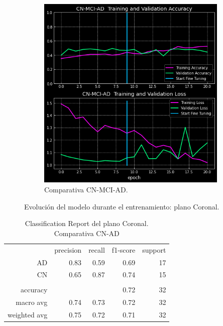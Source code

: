 \begin{figure}[H]
\begin{subfigure}{0.45\textwidth}
        \includegraphics[width=\textwidth]{./imgs/resultados/coronal/CN_MCI_AD_output_CORONAL}
        \caption{Comparativa CN-MCI-AD. }
        \label{fig:coronal-c-mci-ad}
    \end{subfigure}
    \caption{Evolución del modelo durante el entrenamiento: plano Coronal.} \label{fig:coronal-model}
\end{figure}

\begin{table}[H]
    \centering
    \begin{tabular}{r r r r r}
        & precision & recall & f1-score & support \\
        AD & 0.83 & 0.59 & 0.69 & 17 \\
        CN & 0.65 & 0.87 & 0.74 & 15 \\
        & & & & \\
        accuracy &  &  & 0.72 & 32 \\
        macro avg & 0.74 & 0.73 & 0.72 & 32 \\
        weighted avg & 0.75 & 0.72 & 0.71 & 32 \\
    \end{tabular}
    \caption{Classification Report del plano Coronal. Comparativa CN-AD}
    \label{tab:cr-coronal-cn-ad}
\end{table}

